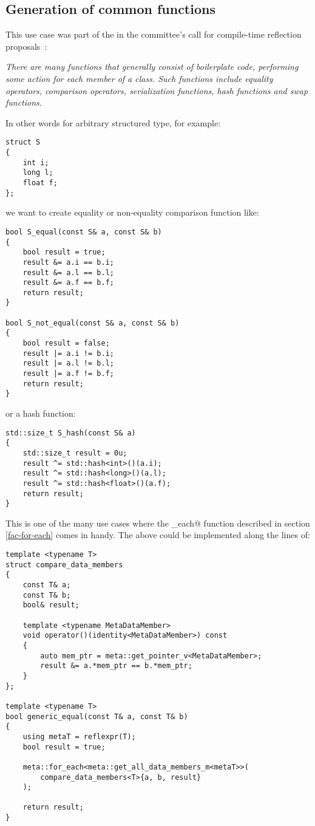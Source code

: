 \subsection{Generation of common functions}
\label{use-case-common-func}

This use case was part of the  in the committee's
call for compile-time reflection proposals~\cite{ISOCPP-N3814}: 

{\em There are many functions that generally consist of boilerplate code,
performing some action for each member of a class. Such functions include
equality operators, comparison operators, serialization functions,
hash functions and swap functions.
}

In other words for arbitrary structured type, for example:

\begin{verbatim}
struct S
{
	int i;
	long l;
	float f;
};
\end{verbatim}

we want to create equality or non-equality comparison function like:

\begin{verbatim}
bool S_equal(const S& a, const S& b)
{
	bool result = true;
	result &= a.i == b.i;
	result &= a.l == b.l;
	result &= a.f == b.f;
	return result;
}

bool S_not_equal(const S& a, const S& b)
{
	bool result = false;
	result |= a.i != b.i;
	result |= a.l != b.l;
	result |= a.f != b.f;
	return result;
}
\end{verbatim}

or a hash function:

\begin{verbatim}
std::size_t S_hash(const S& a)
{
	std::size_t result = 0u;
	result ^= std::hash<int>()(a.i);
	result ^= std::hash<long>()(a.l);
	result ^= std::hash<float>()(a.f);
	return result;
}
\end{verbatim}

This is one of the many use cases where the \verb@for_each@ function
described in section \ref{fac-for-each} comes in handy. The above could be
implemented along the lines of:

\begin{verbatim}
template <typename T>
struct compare_data_members
{
	const T& a;
	const T& b;
	bool& result;

	template <typename MetaDataMember>
	void operator()(identity<MetaDataMember>) const
	{
		auto mem_ptr = meta::get_pointer_v<MetaDataMember>;
		result &= a.*mem_ptr == b.*mem_ptr;
	}
};

template <typename T>
bool generic_equal(const T& a, const T& b)
{
	using metaT = reflexpr(T);
	bool result = true;

	meta::for_each<meta::get_all_data_members_m<metaT>>(
		compare_data_members<T>{a, b, result}
	);

	return result;
}
\end{verbatim}

